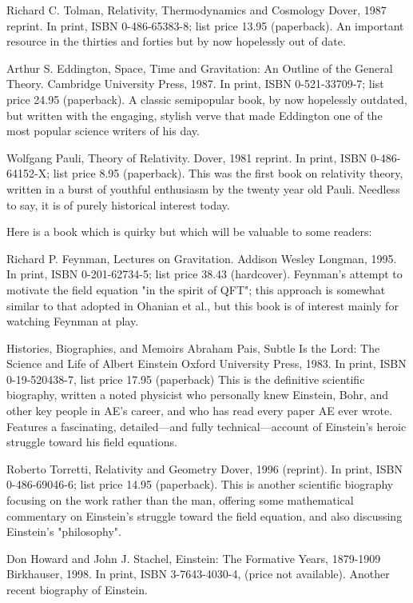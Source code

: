 \documentclass[10pt,a4paper]{book}
\theoremstyle{definition}
\begin{document}
Richard C. Tolman,
Relativity, Thermodynamics and Cosmology
Dover, 1987 reprint.
In print, ISBN 0-486-65383-8; list price 13.95 (paperback).
An important resource in the thirties and forties but by now hopelessly out of date.

Arthur S. Eddington,
Space, Time and Gravitation: An Outline of the General Theory.
Cambridge University Press, 1987.
In print, ISBN 0-521-33709-7; list price 24.95 (paperback).
A classic semipopular book, by now hopelessly outdated, but written with the engaging, stylish verve that made Eddington one of the most popular science writers of his day.

Wolfgang Pauli,
Theory of Relativity.
Dover, 1981 reprint.
In print, ISBN 0-486-64152-X; list price 8.95 (paperback).
This was the first book on relativity theory, written in a burst of youthful enthusiasm by the twenty year old Pauli.  Needless to say, it is of purely historical interest today.

Here is a book which is quirky but which will be valuable to some readers:

Richard P. Feynman,
Lectures on Gravitation.
Addison Wesley Longman, 1995.
In print, ISBN 0-201-62734-5; list price 38.43 (hardcover).
Feynman's attempt to motivate the field equation "in the spirit of QFT"; this approach is somewhat similar to that adopted in Ohanian et al., but this book is of interest mainly for watching Feynman at play.




Histories, Biographies, and Memoirs
Abraham Pais,
Subtle Is the Lord: The Science and Life of Albert Einstein
Oxford University Press, 1983.
In print, ISBN 0-19-520438-7, list price 17.95 (paperback)
This is the definitive scientific biography, written a noted physicist who personally knew Einstein, Bohr, and other key people in AE's career, and who has read every paper AE ever wrote.  Features a fascinating, detailed—and fully technical—account of Einstein's heroic struggle toward his field equations.

Roberto Torretti,
Relativity and Geometry
Dover, 1996 (reprint).
In print, ISBN 0-486-69046-6; list price 14.95 (paperback).
This is another scientific biography focusing on the work rather than the man, offering some mathematical commentary on Einstein's struggle toward the field equation, and also discussing Einstein's "philosophy".

Don Howard and John J. Stachel,
Einstein: The Formative Years, 1879-1909
Birkhauser, 1998.
In print, ISBN 3-7643-4030-4, (price not available).
Another recent biography of Einstein.
\end{document}
